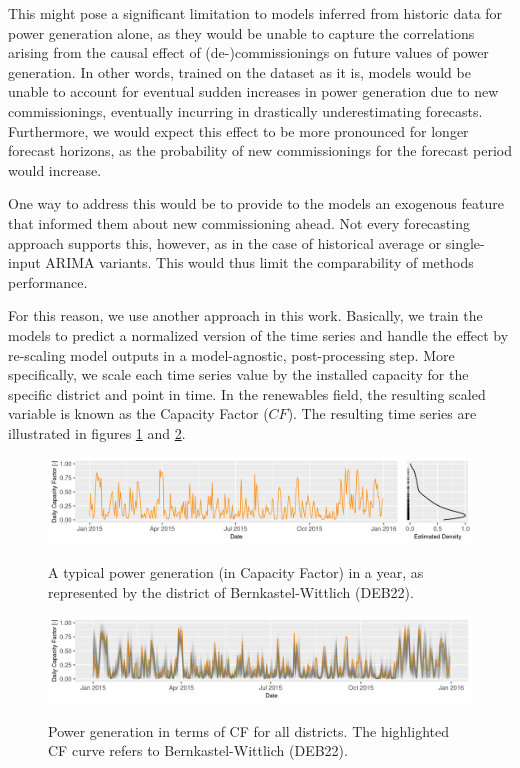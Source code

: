 This might pose a significant limitation to models inferred from historic data for power generation alone, as they would be unable to capture the correlations arising from the causal effect of (de-)commissionings on future values of power generation.
In other words, trained on the dataset as it is, models would be unable to account for eventual sudden increases in power generation due to new commissionings, eventually incurring in drastically underestimating forecasts.
Furthermore, we would expect this effect to be more pronounced for longer forecast horizons, as the probability of new commissionings for the forecast period would increase.

One way to address this would be to provide to the models an exogenous feature that informed them about new commissioning ahead.
Not every forecasting approach supports this, however, as in the case of historical average or single-input ARIMA variants.
This would thus limit the comparability of methods performance.

For this reason, we use another approach in this work.
Basically, we train the models to predict a normalized version of the time series and handle the effect by re-scaling model outputs in a model-agnostic, post-processing step.
More specifically, we scale each time series value by the installed capacity for the specific district and point in time.
In the renewables field, the resulting scaled variable is known as the Capacity Factor ($CF$).
The resulting time series are illustrated in figures \ref{fig:deb22_production_2015_cf} and \ref{fig:all_cf}.

\begin{figure}[H]%
   \centering
    \caption{A typical power generation (in Capacity Factor) in a year, as represented by the district of Bernkastel-Wittlich (DEB22).}
    \includegraphics[width=\textwidth]{wpg-cf-daily-typical-ts_20200703_075319}
   \label{fig:deb22_production_2015_cf}
\end{figure}

\begin{figure}[H]%
   \centering
    \caption{Power generation in terms of CF for all districts. The highlighted CF curve refers to Bernkastel-Wittlich (DEB22).}
    \includegraphics[width=\textwidth]{wpg-cf-daily-all-ts_20200701_163815_fav}
   \label{fig:all_cf}
\end{figure}


